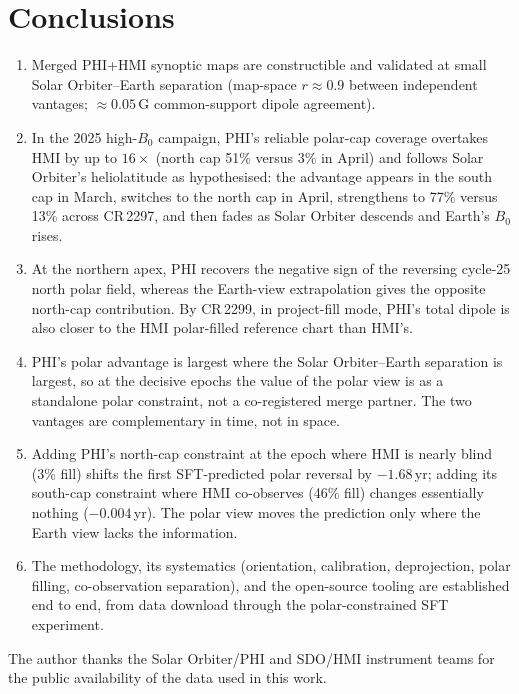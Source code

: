 \documentclass{aa}
\begin{document}
\section{Conclusions}
\label{sec:conclusions}

\begin{enumerate}
    \item Merged PHI+HMI synoptic maps are constructible and validated at small Solar Orbiter--Earth separation (map-space $r \approx 0.9$ between independent vantages; $\approx 0.05$\,G common-support dipole agreement).
    \item In the 2025 high-$B_0$ campaign, PHI's reliable polar-cap coverage overtakes HMI by up to $16\times$ (north cap 51\% versus 3\% in April) and follows Solar Orbiter's heliolatitude as hypothesised: the advantage appears in the south cap in March, switches to the north cap in April, strengthens to 77\% versus 13\% across CR\,2297, and then fades as Solar Orbiter descends and Earth's $B_0$ rises.
    \item At the northern apex, PHI recovers the negative sign of the reversing cycle-25 north polar field, whereas the Earth-view extrapolation gives the opposite north-cap contribution. By CR\,2299, in project-fill mode, PHI's total dipole is also closer to the HMI polar-filled reference chart than HMI's.
    \item PHI's polar advantage is largest where the Solar Orbiter--Earth separation is largest, so at the decisive epochs the value of the polar view is as a standalone polar constraint, not a co-registered merge partner. The two vantages are complementary in time, not in space.
    \item Adding PHI's north-cap constraint at the epoch where HMI is nearly blind (3\% fill) shifts the first SFT-predicted polar reversal by $-1.68$\,yr; adding its south-cap constraint where HMI co-observes (46\% fill) changes essentially nothing ($-0.004$\,yr). The polar view moves the prediction only where the Earth view lacks the information.
    \item The methodology, its systematics (orientation, calibration, deprojection, polar filling, co-observation separation), and the open-source tooling are established end to end, from data download through the polar-constrained SFT experiment.
\end{enumerate}

\begin{acknowledgements}
The author thanks the Solar Orbiter/PHI and SDO/HMI instrument teams for the public availability of the data used in this work.
\end{acknowledgements}
\end{document}
